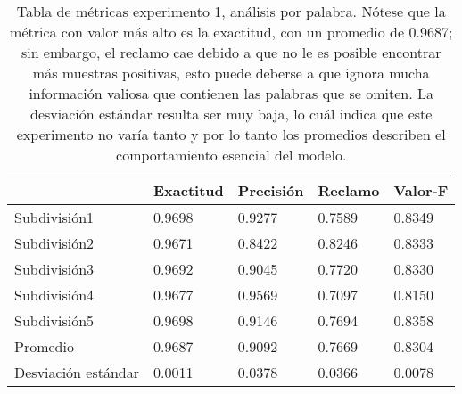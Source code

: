 \begin{table}[h]
    \centering
    \caption{Tabla de métricas experimento 1, análisis por palabra. Nótese que la métrica con valor más alto es la exactitud, con un promedio de 0.9687; sin embargo, el reclamo cae debido a que no le es posible encontrar más muestras positivas, esto puede deberse a que ignora mucha información valiosa que contienen las palabras que se omiten. La desviación estándar resulta ser muy baja, lo cuál indica que este experimento no varía tanto y por lo tanto los promedios describen el comportamiento esencial del modelo.}
\begin{tabular}{|l|llll|}
\hline
              & Exactitud &     Precisión &     Reclamo  &   Valor-F \\ \hline

Subdivisión1            &       0.9698  &       0.9277  &       0.7589  &       0.8349  \\ 
Subdivisión2            &       0.9671  &       0.8422  &       0.8246  &       0.8333  \\ 
Subdivisión3            &       0.9692  &       0.9045  &       0.7720  &       0.8330  \\ 
Subdivisión4            &       0.9677  &       0.9569  &       0.7097  &       0.8150  \\ 
Subdivisión5            &       0.9698  &       0.9146  &       0.7694  &       0.8358  \\ \hline
Promedio                &       0.9687  &       0.9092  &       0.7669  &       0.8304  \\ \hline
Desviación estándar     &       0.0011  &       0.0378  &       0.0366  &       0.0078  \\ \hline

\end{tabular}
		     \label{tab:exp1}
\end{table}